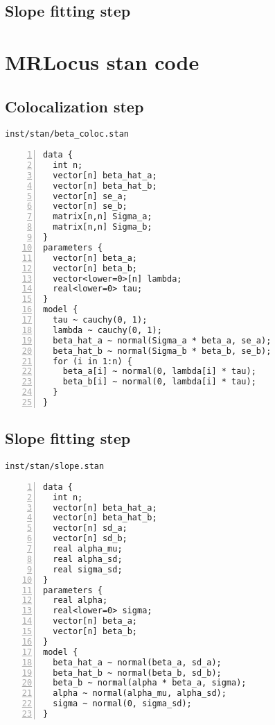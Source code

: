 \documentclass[11pt]{article}
\begin{document}
\subsection{Slope fitting step} \label{sec:slope}

\newpage

\section{MRLocus stan code}

\subsection{Colocalization step}

\texttt{inst/stan/beta\_coloc.stan}

\begin{Verbatim}[frame=single,numbers=left]
data {
  int n;
  vector[n] beta_hat_a;
  vector[n] beta_hat_b;
  vector[n] se_a;
  vector[n] se_b;
  matrix[n,n] Sigma_a;
  matrix[n,n] Sigma_b;
}
parameters {
  vector[n] beta_a;
  vector[n] beta_b;
  vector<lower=0>[n] lambda;
  real<lower=0> tau;
}
model {
  tau ~ cauchy(0, 1);
  lambda ~ cauchy(0, 1);
  beta_hat_a ~ normal(Sigma_a * beta_a, se_a);
  beta_hat_b ~ normal(Sigma_b * beta_b, se_b);
  for (i in 1:n) {
    beta_a[i] ~ normal(0, lambda[i] * tau);
    beta_b[i] ~ normal(0, lambda[i] * tau);
  }
}
\end{Verbatim}

\newpage

\subsection{Slope fitting step}

\texttt{inst/stan/slope.stan}

\begin{Verbatim}[frame=single,numbers=left]
data {
  int n; 
  vector[n] beta_hat_a;
  vector[n] beta_hat_b;
  vector[n] sd_a;
  vector[n] sd_b;
  real alpha_mu;
  real alpha_sd;
  real sigma_sd;
}
parameters {
  real alpha;
  real<lower=0> sigma;
  vector[n] beta_a;
  vector[n] beta_b;
}
model {
  beta_hat_a ~ normal(beta_a, sd_a);
  beta_hat_b ~ normal(beta_b, sd_b);
  beta_b ~ normal(alpha * beta_a, sigma);
  alpha ~ normal(alpha_mu, alpha_sd);
  sigma ~ normal(0, sigma_sd);
}
\end{Verbatim}

\newpage


\end{document}
